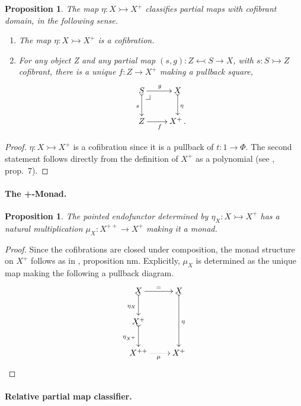 \documentclass[11pt]{article}
\makeatletter
\newcommand{\pbcorner}[1][dr]{\save*!/#1-1.2pc/#1:(-1,1)@^{|-}\restore}
\newcommand{\mono}{\ensuremath{\rightarrowtail}}
\newtheorem{proposition}[theorem]{Proposition}
\theoremstyle{remark}
\theoremstyle{definition}
\makeatother
\begin{document}
\begin{proposition}
The map $\eta : X\mono X^+$ classifies partial maps with cofibrant domain, in the following sense.
\begin{enumerate}
\item The map $\eta : X\mono X^+$ is a cofibration.
\item For any object Z and any partial map $(s,g): Z\leftarrowtail S\to X$, with $s : S\mono Z$ cofibrant, there is a unique $f:Z\to X^+$ making a pullback square,
\[
\xymatrix{
S \ar@{>->}[d]_{s} \pbcorner \ar[r]^g & X \ar@{>->}[d]^{\eta}\\
Z \ar[r]_f & X^+\,.
}
\]
\end{enumerate}
\end{proposition}

\begin{proof}
$\eta : X\mono X^+$ is a cofibration since it is a pullback of $t : 1\to \Phi$. The second statement follows directly from the definition of $X^+$ as a polynomial (see \cite{A:NM}, prop.~7). 
\end{proof}

\paragraph{The +-Monad.}

\begin{proposition}
The pointed endofunctor determined by $\eta_X : X\mono X^+$ has a natural multiplication $\mu_X : X^{++} \to X^+$ making it a monad.
\end{proposition}

\begin{proof}
Since the cofibrations are closed under composition, the monad structure on $X^+$ follows as in \cite{AN}, proposition nm.  Explicitly, $\mu_X$ is determined as the unique map making the following a pullback diagram.
\[
\xymatrix{
X \ar@{>->}[d]_{\eta_X} \ar[r]^= & X \ar@{>->}[dd]^{\eta}\\
X^+ \ar@{>->}[d]_{\eta_{X^+}} & \\
X^{++} \ar@{.>}[r]_\mu & X^+
}
\]
\end{proof}

\paragraph{Relative partial map classifier.}
\end{document}
